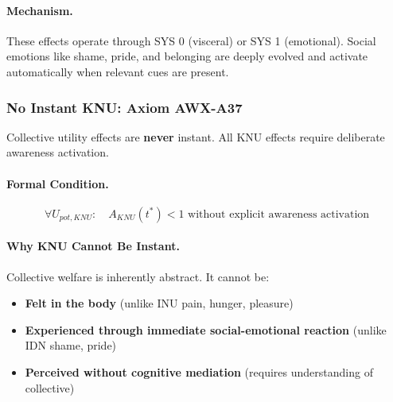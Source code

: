 \paragraph{Mechanism.}
These effects operate through SYS 0 (visceral) or SYS 1 (emotional).
Social emotions like shame, pride, and belonging are deeply evolved
and activate automatically when relevant cues are present.

\subsubsection{No Instant KNU: Axiom AWX-A37}

\begin{axiom}
\label{ax:no-instant-knu}
Collective utility effects are \textbf{never} instant. All KNU effects 
require deliberate awareness activation.
\end{axiom}

\paragraph{Formal Condition.}
\begin{equation}
\boxed{\forall U_{pot,KNU}: \quad A_{KNU}(t^*) < 1 \text{ without explicit awareness activation}}
\end{equation}

\paragraph{Why KNU Cannot Be Instant.}
Collective welfare is inherently abstract. It cannot be:
\begin{itemize}
\item \textbf{Felt in the body} (unlike INU pain, hunger, pleasure)
\item \textbf{Experienced through immediate social-emotional reaction} (unlike IDN shame, pride)
\item \textbf{Perceived without cognitive mediation} (requires understanding of collective)
\end{itemize}

